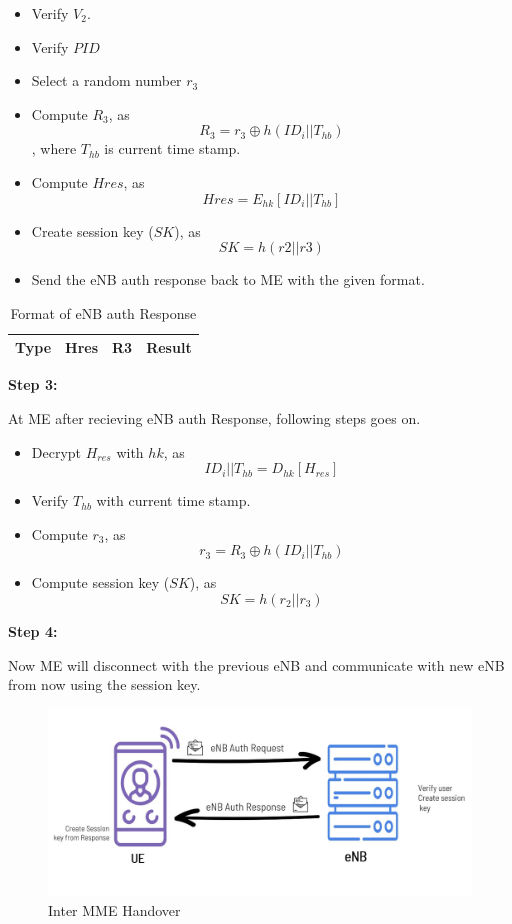 {\begin{itemize}
{\begin{itemize}
                \item Verify \(V_2\).
                \item Verify \(PID\)
                \item Select a random number \(r_3\)
                \item Compute \(R_3\), as \[R_3 = r_3 \oplus h(ID_i||T_{hb})\], where \(T_{hb}\) is current time stamp.
                \item Compute \(Hres\), as \[Hres = E_{hk}[ID_i||T_{hb}]\]
                \item Create session key (\(SK\)), as \[SK = h(r2||r3)\]
                \item Send the eNB auth response back to ME with the given format.
            \end{itemize}
            \begin{table}[ht]
                \centering
                \begin{tabular}{|c|c|c|c|}
                    \hline
                    Type & Hres & R3 & Result\\
                    \hline
                \end{tabular}
                \caption{Format of eNB auth Response}
            \end{table}
        }
        \item \textbf{Step 3: }{
            At ME after recieving eNB auth Response, following steps goes on.
            \begin{itemize}
                \item Decrypt \(H_{res}\) with \(hk\), as \[ID_i||T_{hb} = D_{hk}[H_{res}]\]
                \item Verify \(T_{hb}\) with current time stamp.
                \item Compute \(r_3\), as \[r_3 = R_3 \oplus h(ID_i||T_{hb}) \]
                \item Compute session key (\(SK\)), as \[SK = h(r_2||r_3)\]
            \end{itemize}
        }
        \item \textbf{Step 4: }{
        \item Now ME will disconnect with the previous eNB and communicate with new eNB from now using the session key.
        }
        \begin{figure}[ht]
            \centering
            \includegraphics[scale=0.5]{img/enba.jpg}
            \caption{Inter MME Handover}
        \end{figure}
    \end{itemize}
}